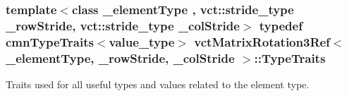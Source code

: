 \hypertarget{classvct_matrix_rotation3_ref_a1627d01cd92c60b2a20b920593015948}{
\subsubsection[{Type\-Traits}]{\setlength{\rightskip}{0pt plus 5cm}template$<$class \-\_\-element\-Type , vct\-::stride\-\_\-type \-\_\-row\-Stride, vct\-::stride\-\_\-type \-\_\-col\-Stride$>$ typedef {\bf cmn\-Type\-Traits}$<$value\-\_\-type$>$ {\bf vct\-Matrix\-Rotation3\-Ref}$<$ \-\_\-element\-Type, \-\_\-row\-Stride, \-\_\-col\-Stride $>$\-::{\bf Type\-Traits}}}\label{classvct_matrix_rotation3_ref_a1627d01cd92c60b2a20b920593015948}
Traits used for all useful types and values related to the element type. 

